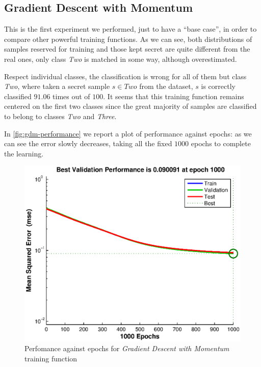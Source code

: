 \documentclass[10pt,a4paper]{article}
\begin{document}
    \subsection{Gradient Descent with Momentum}
    
    This is the first experiment we performed, just to have a ``base case'', in order to 
    compare other powerful training functions. As we can see, both distributions of samples
    reserved for training and those kept secret are quite different from the real ones, only
    class \emph{Two} is matched in some way, although overestimated.

    Respect individual classes, the classification is wrong for all of them but class \emph{Two}, 
    where taken a secret sample $s \in Two$ from the dataset, $s$ is correctly classified $91.06$ times out of $100$.
    It seems that this training function remains centered on the first two classes since the
    great majority of samples are classified to belong to classes \emph{Two} and \emph{Three}.

    In \autoref{fig:gdm-performance} we report a plot of performance against epochs: as we can
    see the error slowly decreases, taking all the fixed $1000$ epochs to complete the learning.

    \begin{figure}
    \centering
    \includegraphics[scale=0.7]{eps/gradient-descent-performance.eps}
    \caption{Perfomance against epochs for \emph{Gradient Descent with Momentum} training function}
    \label{fig:gdm-performance}
    \end{figure}
\end{document}
